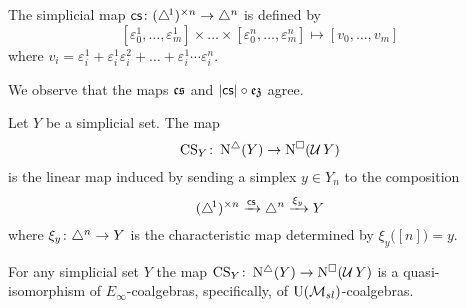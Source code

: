 %


\begin{definition}
	The simplicial map $\operatorname{\mathsf{cs}} \colon (\triangle^{\!1})^{\times n} \to \triangle^n$ is defined by
	\[
	[\varepsilon_0^1, \dots, \varepsilon_m^1]
	\times \dots \times
	[\varepsilon_0^n, \dots, \varepsilon_m^n]
	\mapsto
	[v_0, \dots, v_m]
	\]
	where $v_i = \varepsilon_i^1 + \varepsilon_i^1 \varepsilon_i^2 + \dots + \varepsilon_i^1 \dotsm \varepsilon_i^n$.
\end{definition}

We observe that the maps $\operatorname{\mathfrak{cs}}$ and $\lvert\operatorname{\mathsf{cs}}\rvert \circ \operatorname{\mathfrak{ez}}$ agree.

\begin{definition}
	Let $Y$ be a simplicial set.
	The map
	\[
	\operatorname{CS}_Y \colon \operatorname{N^{\triangle}}(Y) \to \operatorname{N^{\square}}(\operatorname{\mathcal{U}} Y)
	\]
	is the linear map induced by sending a simplex $y \in Y_n$ to the composition
	\[
	(\triangle^{\!1})^{\times n} \xrightarrow{\operatorname{\mathsf{cs}}} \triangle^n \xrightarrow{\xi_y} Y
	\]
	where $\xi_y \colon \triangle^n \to Y$ is the characteristic map determined by $\xi_y \big( [n] \big) = y$.
\end{definition}

\begin{theorem} \label{t:main comparison}
	For any simplicial set $Y$ the map $\operatorname{CS}_Y \colon \operatorname{N^{\triangle}}(Y) \to \operatorname{N^{\square}}(\operatorname{\mathcal{U}} Y)$ is a quasi-isomorphism of $E_\infty$-coalgebras, specifically, of ${\operatorname{U}(\mathcal{M}_{sl})}$-coalgebras.
\end{theorem}

